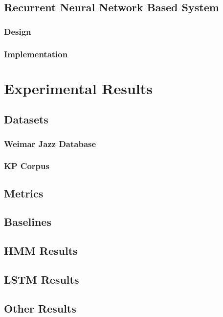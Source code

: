 \documentclass[bsc,singlespacing,logo, parskip, deptreport]{infthesis}
\begin{document}
\section{Recurrent Neural Network Based System}
\subsection{Design}
\subsection{Implementation}


\chapter{Experimental Results}

\section{Datasets}
\subsection{Weimar Jazz Database}
\subsection{KP Corpus}

\section{Metrics}

\section{Baselines}

\section{HMM Results}

\section{LSTM Results}

\section{Other Results}
\end{document}
